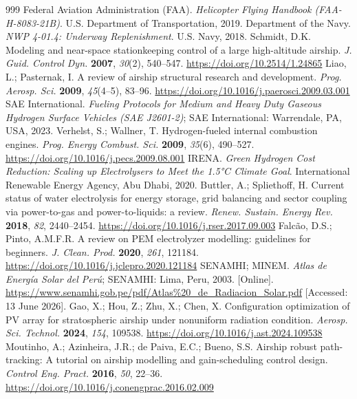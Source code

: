 \documentclass[applsci,article,submit,pdftex,moreauthors]{Definitions/mdpi}
\begin{document}
\begin{thebibliography}{999}
 Federal Aviation Administration (FAA). \textit{Helicopter Flying Handbook (FAA-H-8083-21B)}. U.S. Department of Transportation, 2019.
 Department of the Navy. \textit{NWP 4-01.4: Underway Replenishment}. U.S. Navy, 2018.
 Schmidt, D.K. Modeling and near-space stationkeeping control of a large high-altitude airship. \textit{J. Guid. Control Dyn.} \textbf{2007}, \textit{30}(2), 540--547. \url{https://doi.org/10.2514/1.24865}
 Liao, L.; Pasternak, I. A review of airship structural research and development. \textit{Prog. Aerosp. Sci.} \textbf{2009}, \textit{45}(4--5), 83--96. \url{https://doi.org/10.1016/j.paerosci.2009.03.001}
 SAE International. \textit{Fueling Protocols for Medium and Heavy Duty Gaseous Hydrogen Surface Vehicles (SAE J2601-2)}; SAE International: Warrendale, PA, USA, 2023.
 Verhelst, S.; Wallner, T. Hydrogen-fueled internal combustion engines. \textit{Prog. Energy Combust. Sci.} \textbf{2009}, \textit{35}(6), 490--527. \url{https://doi.org/10.1016/j.pecs.2009.08.001}
 IRENA. \textit{Green Hydrogen Cost Reduction: Scaling up Electrolysers to Meet the 1.5°C Climate Goal}. International Renewable Energy Agency, Abu Dhabi, 2020.
 Buttler, A.; Spliethoff, H. Current status of water electrolysis for energy storage, grid balancing and sector coupling via power-to-gas and power-to-liquids: a review. \textit{Renew. Sustain. Energy Rev.} \textbf{2018}, \textit{82}, 2440--2454. \url{https://doi.org/10.1016/j.rser.2017.09.003}
 Falcão, D.S.; Pinto, A.M.F.R. A review on PEM electrolyzer modelling: guidelines for beginners. \textit{J. Clean. Prod.} \textbf{2020}, \textit{261}, 121184. \url{https://doi.org/10.1016/j.jclepro.2020.121184}
 SENAMHI; MINEM. \textit{Atlas de Energía Solar del Perú}; SENAMHI: Lima, Peru, 2003. [Online]. \url{https://www.senamhi.gob.pe/pdf/Atlas%20_de_Radiacion_Solar.pdf} [Accessed: 13 June 2026].
 Gao, X.; Hou, Z.; Zhu, X.; Chen, X. Configuration optimization of PV array for stratospheric airship under nonuniform radiation condition. \textit{Aerosp. Sci. Technol.} \textbf{2024}, \textit{154}, 109538. \url{https://doi.org/10.1016/j.ast.2024.109538}
 Moutinho, A.; Azinheira, J.R.; de Paiva, E.C.; Bueno, S.S. Airship robust path-tracking: A tutorial on airship modelling and gain-scheduling control design. \textit{Control Eng. Pract.} \textbf{2016}, \textit{50}, 22--36. \url{https://doi.org/10.1016/j.conengprac.2016.02.009}

\end{thebibliography}
\end{document}
